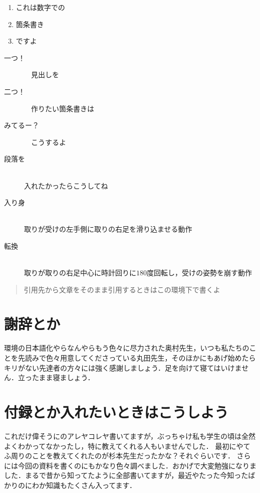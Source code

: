 \documentclass[a4j]{jsarticle}
\numberwithin{equation}{section}%
\begin{document}
\begin{enumerate}
 \item これは数字での
 \item 箇条書き
 \item ですよ
\end{enumerate}

\begin{description}
 \item[一つ！]　見出しを 
 \item[二つ！]　作りたい箇条書きは
 \item[みてるー？]　こうするよ 
 \item[段落を]\mbox{}\\
	    入れたかったらこうしてね
 \item[入り身]\mbox{}\\
	    取りが受けの左手側に取りの右足を滑り込ませる動作
 \item[転換]\mbox{}\\
	    取りが取りの右足中心に時計回りに$180$度回転し，受けの姿勢を崩す動作
\end{description}



\begin{quotation}
 引用先から文章をそのまま引用するときはこの環境下で書くよ
\end{quotation}

  
\section*{謝辞とか}

\LaTeXe 環境の日本語化やらなんやらもう色々に尽力された奥村先生\cite{okumura7th}，いつも私たちのことを先読みで色々用意してくださっている丸田先生，そのほかにもあげ始めたらキリがない先達者の方々には強く感謝しましょう．足を向けて寝てはいけません．立ったまま寝ましょう．

\appendix
\section{付録とか入れたいときはこうしよう}

これだけ偉そうに\LaTeXe のアレヤコレヤ書いてますが，ぶっちゃけ私も学生の頃は全然よくわかってなかったし，特に教えてくれる人もいませんでした．
最初にやてふ周りのことを教えてくれたのが杉本先生だったかな？それぐらいです．
さらには今回の資料を書くのにもかなり色々調べました．おかげで大変勉強になりました．まるで昔から知ってたように全部書いてますが，最近やたった今知ったばかりのにわか知識もたくさん入ってます．
\end{document}
